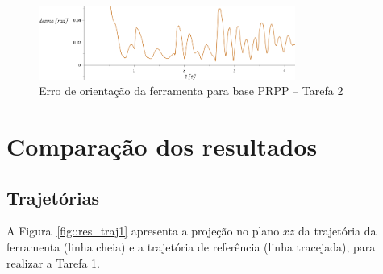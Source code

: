 \begin{figure}[h!]
	\centering 
 	\includegraphics[width=0.75\textwidth]{figs/t2_erroori_base_prpp}
 	\caption{Erro de orientação da ferramenta para base PRPP -- Tarefa
 	2}
 	\label{fig::t2_erroori_base_prpp}
\end{figure}

\clearpage
\section{Comparação dos resultados} \label{sec::comparacao}

\subsection{Trajetórias}

A Figura~\ref{fig::res_traj1} apresenta a projeção no plano $xz$ da trajetória
da ferramenta (linha cheia) e a trajetória de referência (linha tracejada), para
realizar a Tarefa 1.

